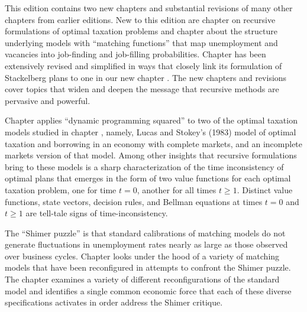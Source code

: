  \noindent
This edition
contains two  new chapters and substantial revisions of many
other chapters from earlier editions.  New to this edition
are chapter
 on recursive formulations of optimal taxation problems and chapter 
about the structure underlying models with ``matching functions'' that map unemployment and vacancies into
job-finding and job-filling probabilities. Chapter  has been extensively revised and simplified in ways
that closely link its formulation of Stackelberg plans   to  one in our  new chapter .
The new chapters and  revisions cover   topics that
 widen and deepen
the message that recursive methods are pervasive and powerful.


\noindent
Chapter  applies ``dynamic programming squared''  to two of the optimal taxation models studied in
chapter , namely, Lucas and Stokey's (1983) model of optimal taxation and borrowing in an economy with complete markets, and
an incomplete markets version of that model. Among other insights that  recursive formulations bring to  these models is a sharp
characterization of the time inconsistency of optimal plans that emerges in the form of two value functions for each optimal taxation problem,
one for time $t=0$, another for all times $t \geq 1$. Distinct value functions, state vectors,  decision rules,  and  Bellman equations at times $t=0$  and $t \geq 1$
are tell-tale signs of time-inconsistency.

The ``Shimer puzzle'' is  that standard calibrations of matching models do not generate fluctuations in unemployment rates nearly as large
as those observed over business cycles. %
Chapter  looks under the hood of a variety of matching models that have been reconfigured in attempts to confront the Shimer puzzle.
The chapter examines a variety of different reconfigurations of the standard model and identifies  a
single common economic force that each  of these diverse specifications activates in order address the Shimer critique.




